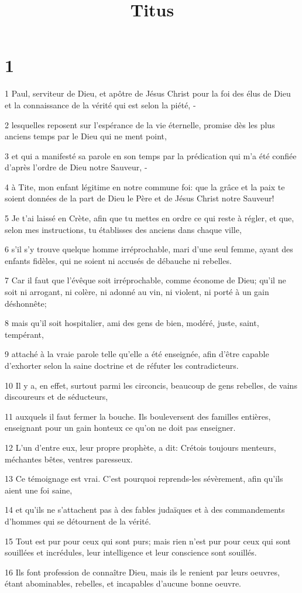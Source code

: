 

\title{Titus}


\chapter{1}

\par 1 Paul, serviteur de Dieu, et apôtre de Jésus Christ pour la foi des élus de Dieu et la connaissance de la vérité qui est selon la piété, -
\par 2 lesquelles reposent sur l'espérance de la vie éternelle, promise dès les plus anciens temps par le Dieu qui ne ment point,
\par 3 et qui a manifesté sa parole en son temps par la prédication qui m'a été confiée d'après l'ordre de Dieu notre Sauveur, -
\par 4 à Tite, mon enfant légitime en notre commune foi: que la grâce et la paix te soient données de la part de Dieu le Père et de Jésus Christ notre Sauveur!
\par 5 Je t'ai laissé en Crète, afin que tu mettes en ordre ce qui reste à régler, et que, selon mes instructions, tu établisses des anciens dans chaque ville,
\par 6 s'il s'y trouve quelque homme irréprochable, mari d'une seul femme, ayant des enfants fidèles, qui ne soient ni accusés de débauche ni rebelles.
\par 7 Car il faut que l'évêque soit irréprochable, comme économe de Dieu; qu'il ne soit ni arrogant, ni colère, ni adonné au vin, ni violent, ni porté à un gain déshonnête;
\par 8 mais qu'il soit hospitalier, ami des gens de bien, modéré, juste, saint, tempérant,
\par 9 attaché à la vraie parole telle qu'elle a été enseignée, afin d'être capable d'exhorter selon la saine doctrine et de réfuter les contradicteurs.
\par 10 Il y a, en effet, surtout parmi les circoncis, beaucoup de gens rebelles, de vains discoureurs et de séducteurs,
\par 11 auxquels il faut fermer la bouche. Ils bouleversent des familles entières, enseignant pour un gain honteux ce qu'on ne doit pas enseigner.
\par 12 L'un d'entre eux, leur propre prophète, a dit: Crétois toujours menteurs, méchantes bêtes, ventres paresseux.
\par 13 Ce témoignage est vrai. C'est pourquoi reprends-les sévèrement, afin qu'ils aient une foi saine,
\par 14 et qu'ils ne s'attachent pas à des fables judaïques et à des commandements d'hommes qui se détournent de la vérité.
\par 15 Tout est pur pour ceux qui sont purs; mais rien n'est pur pour ceux qui sont souillées et incrédules, leur intelligence et leur conscience sont souillés.
\par 16 Ils font profession de connaître Dieu, mais ils le renient par leurs oeuvres, étant abominables, rebelles, et incapables d'aucune bonne oeuvre.

